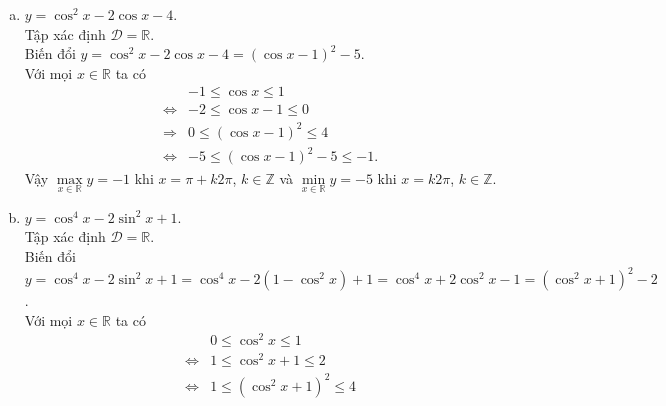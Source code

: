\begin{bt}
{\begin{enumerate}[a)]
			      Biến đổi $y=4 \sin^2 x-4 \sin x+3=\left(2\sin x+1\right)^2+2$.\\
			      Với mọi $x\in \mathbb{R}$ ta có
			      \allowdisplaybreaks
			      \begin{eqnarray*}
				      & & -1\leq \sin x\leq 1\\
				      &\Leftrightarrow& -1\leq 2\sin x+1\leq 3\\
				      &\Leftrightarrow&0\leq \left( 2\sin x+1\right)^2\leq 9\\
				      &\Leftrightarrow&2\leq \left( 2\sin x+1\right)^2+2\leq 11.
			      \end{eqnarray*}
			      Vậy $\max\limits_{x \in \mathbb{R}} y=11$ khi $x=\dfrac{\pi}{2}+k2\pi$, $k\in \mathbb{Z}$ và $\min\limits_{x \in \mathbb{R}} y=2$ khi $x=-\dfrac{\pi}{6}+k2\pi$ hoặc $x=\dfrac{7\pi}{6}+k2\pi$, $k\in \mathbb{Z}$.
			\item $y=\cos^2 x-2 \cos x-4$.\\
			      Tập xác định $\mathscr{D}=\mathbb{R}$.\\
			      Biến đổi $y=\cos^2 x-2 \cos x-4=\left(\cos x-1\right)^2-5$.\\
			      Với mọi $x\in \mathbb{R}$ ta có
			      \allowdisplaybreaks
			      \begin{eqnarray*}
				      & & -1\leq \cos x\leq 1\\
				      &\Leftrightarrow& -2\leq \cos x-1\leq 0\\
				      &\Rightarrow&0\leq \left( \cos x-1\right)^2\leq 4\\
				      &\Leftrightarrow&-5\leq \left( \cos x-1\right)^2-5\leq -1.
			      \end{eqnarray*}
			      Vậy $\max\limits_{x \in \mathbb{R}} y=-1$ khi $x=\pi+k2\pi$, $k\in \mathbb{Z}$ và $\min\limits_{x \in \mathbb{R}} y=-5$ khi $x=k2\pi$, $k\in \mathbb{Z}$.
			\item $y=\cos^4 x-2 \sin^2 x+1$. \\
			      Tập xác định $\mathscr{D}=\mathbb{R}$.\\
			      Biến đổi $y=\cos^4 x-2 \sin^2 x+1=\cos^4 x-2 \left(1-\cos^2 x\right)+1=\cos^4 x+2 \cos^2 x-1=\left(\cos^2 x+1\right)^2-2 $.\\
			      Với mọi $x\in \mathbb{R}$ ta có
			      \allowdisplaybreaks
			      \begin{eqnarray*}
				      & & 0\leq \cos^2 x\leq 1\\
				      &\Leftrightarrow& 1\leq \cos^2 x+1\leq 2\\
				      &\Leftrightarrow&1\leq \left( \cos^2 x+1\right)^2\leq 4\\

\end{eqnarray*}
\end{enumerate}}
\end{bt}
